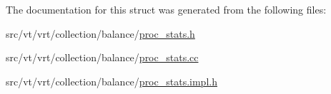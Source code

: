 The documentation for this struct was generated from the following files\+:\begin{DoxyCompactItemize}
\item 
src/vt/vrt/collection/balance/\hyperlink{proc__stats_8h}{proc\+\_\+stats.\+h}\item 
src/vt/vrt/collection/balance/\hyperlink{proc__stats_8cc}{proc\+\_\+stats.\+cc}\item 
src/vt/vrt/collection/balance/\hyperlink{proc__stats_8impl_8h}{proc\+\_\+stats.\+impl.\+h}\end{DoxyCompactItemize}
